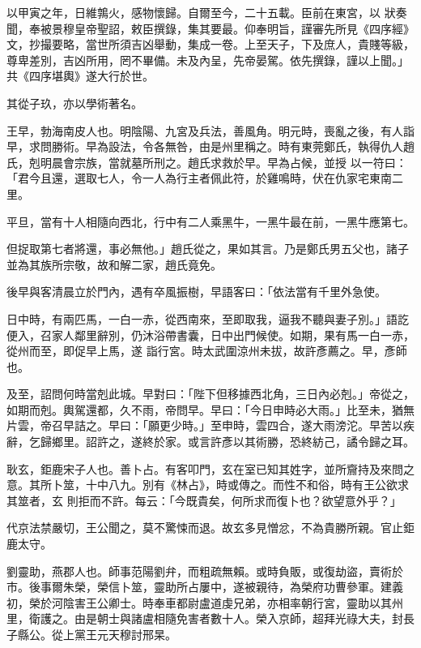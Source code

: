 \begin{pinyinscope}
 以甲寅之年，日維鶉火，感物懷歸。自爾至今，二十五載。臣前在東宮，以
 狀奏聞，奉被景穆皇帝聖詔，敕臣撰錄，集其要最。仰奉明旨，謹審先所見《四序經》文，抄撮要略，當世所須吉凶舉動，集成一卷。上至天子，下及庶人，貴賤等級，尊卑差別，吉凶所用，罔不畢備。未及內呈，先帝晏駕。依先撰錄，謹以上聞。」共《四序堪輿》遂大行於世。



 其從子玖，亦以學術著名。



 王早，勃海南皮人也。明陰陽、九宮及兵法，善風角。明元時，喪亂之後，有人詣早，求問勝術。早為設法，令各無咎，由是州里稱之。時有東莞鄭氏，執得仇人趙氏，剋明晨會宗族，當就墓所刑之。趙氏求救於早。早為占候，並授
 以一符曰：「君今且還，選取七人，令一人為行主者佩此符，於雞鳴時，伏在仇家宅東南二里。



 平旦，當有十人相隨向西北，行中有二人乘黑牛，一黑牛最在前，一黑牛應第七。



 但捉取第七者將還，事必無他。」趙氏從之，果如其言。乃是鄭氏男五父也，諸子並為其族所宗敬，故和解二家，趙氏竟免。



 後早與客清晨立於門內，遇有卒風振樹，早語客曰：「依法當有千里外急使。



 日中時，有兩匹馬，一白一赤，從西南來，至即取我，逼我不聽與妻子別。」語訖便入，召家人鄰里辭別，仍沐浴帶書囊，日中出門候使。如期，果有馬一白一赤，從州而至，即促早上馬，遂
 詣行宮。時太武圍涼州未拔，故許彥薦之。早，彥師也。



 及至，詔問何時當剋此城。早對曰：「陛下但移據西北角，三日內必剋。」帝從之，如期而剋。輿駕還都，久不雨，帝問早。早曰：「今日申時必大雨。」比至未，猶無片雲，帝召早詰之。早曰：「願更少時。」至申時，雲四合，遂大雨滂沱。早苦以疾辭，乞歸鄉里。詔許之，遂終於家。或言許彥以其術勝，恐終紡己，譎令歸之耳。



 耿玄，鉅鹿宋子人也。善卜占。有客叩門，玄在室已知其姓字，並所齎持及來問之意。其所卜筮，十中八九。別有《林占》，時或傳之。而性不和俗，時有王公欲求其筮者，玄
 則拒而不許。每云：「今既貴矣，何所求而復卜也？欲望意外乎？」



 代京法禁嚴切，王公聞之，莫不驚悚而退。故玄多見憎忿，不為貴勝所親。官止鉅鹿太守。



 劉靈助，燕郡人也。師事范陽劉弁，而粗疏無賴。或時負販，或復劫盜，賣術於市。後事爾朱榮，榮信卜筮，靈助所占屢中，遂被親待，為榮府功曹參軍。建義初，榮於河陰害王公卿士。時奉車都尉盧道虔兄弟，亦相率朝行宮，靈助以其州里，衛護之。由是朝士與諸盧相隨免害者數十人。榮入京師，超拜光祿大夫，封長子縣公。從上黨王元天穆討邢杲。




\end{pinyinscope}
